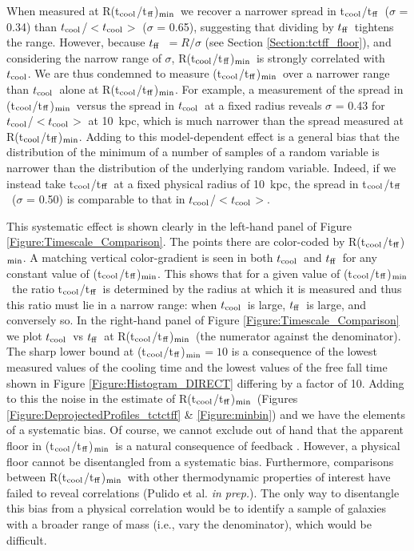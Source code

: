\documentclass[twocolumn]{aastex6}
\newcommand{\tctff}{{t$_{\rm cool}$/t$_{\rm ff}$}}
\newcommand{\tctffmin}{(\tctff)$_{\rm min}$}
\newcommand{\Rtctffmin}{R(\tctff)$_{\rm min}$}
\newcommand{\tc}{$t_{\rm cool}$}
\newcommand{\tff}{$t_{\rm ff}$}
\begin{document}
When measured at \Rtctffmin\ we recover a narrower spread in \tctff\ ($\sigma$ = 0.34) than \tc/$<$\tc$>$ ($\sigma$ = 0.65), suggesting that dividing by \tff\ tightens the range.  However, because \tff\ $= R/\sigma$ (see Section \ref{Section:tctff_floor}),  and considering the narrow range of $\sigma$, \Rtctffmin\ is strongly correlated with \tc.  We are thus condemned to measure \tctffmin\ over a narrower range than \tc\ alone at \Rtctffmin.  For example, a measurement of the spread in \tctffmin\ versus the spread in \tc\ at a fixed radius reveals $\sigma$ = 0.43 for \tc/$<$\tc$>$ at 10~kpc, which is much narrower than the spread measured at \Rtctffmin.  Adding to this model-dependent effect is a general bias that the distribution of the minimum of a number of samples of a random variable is narrower than the distribution of the underlying random variable.  Indeed, if we instead take \tctff\ at a fixed physical radius of 10~kpc, the spread in \tctff\ ($\sigma$ = 0.50) is comparable to that in \tc/$<$\tc$>$.

This systematic effect is shown clearly in the left-hand panel of Figure \ref{Figure:Timescale_Comparison}.  The points there are color-coded by \Rtctffmin. A matching vertical color-gradient is seen in both \tc\ and \tff\ for any constant value of \tctffmin. This shows that for a given value of \tctffmin\ the ratio \tctff\ is determined by the radius at which it is measured and thus this ratio must lie in a narrow range:  when \tc\ is large, \tff\ is large, and conversely so.  In the right-hand panel of Figure \ref{Figure:Timescale_Comparison} we plot \tc\ vs \tff\ at \Rtctffmin\ (the numerator against the denominator). The sharp lower bound at \tctffmin$=10$ is a consequence of the lowest measured values of the cooling time and the lowest values of the free fall time shown in Figure \ref{Figure:Histogram_DIRECT} differing by a factor of 10.  Adding to this the noise in the estimate of \Rtctffmin\ (Figures \ref{Figure:DeprojectedProfiles_tctctff} \& \ref{Figure:minbin}) and we have the elements of a systematic bias.  Of course, we cannot exclude out of hand that the apparent floor in \tctffmin\ is a natural consequence of feedback \cite[e.g.][]{Voit15b}.  However, a physical floor cannot be disentangled from a systematic bias.  Furthermore, comparisons between \Rtctffmin\ with other thermodynamic properties of interest have failed to reveal correlations (Pulido et al. {\em in prep.}).  The only way to disentangle this bias from a physical correlation would be to identify a sample of galaxies with a broader range of mass (i.e., vary the denominator), which would be difficult.
\end{document}
